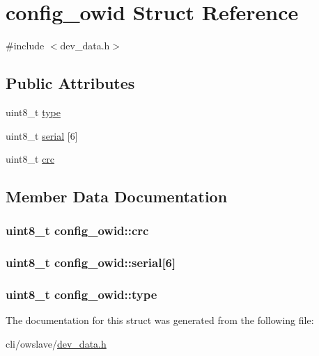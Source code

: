 \hypertarget{structconfig__owid}{\section{config\-\_\-owid Struct Reference}
\label{structconfig__owid}
}


{\ttfamily \#include $<$dev\-\_\-data.\-h$>$}

\subsection*{Public Attributes}
\begin{DoxyCompactItemize}
\item 
uint8\-\_\-t \hyperlink{structconfig__owid_a923d52b3e8b0ddd213df86cd5a6fc760}{type}
\item 
uint8\-\_\-t \hyperlink{structconfig__owid_abfab5874606cb60963c2d5817fe444e8}{serial} \mbox{[}6\mbox{]}
\item 
uint8\-\_\-t \hyperlink{structconfig__owid_af628a17297757d5927b23e4e9993261a}{crc}
\end{DoxyCompactItemize}


\subsection{Member Data Documentation}
\hypertarget{structconfig__owid_af628a17297757d5927b23e4e9993261a}{
\subsubsection[{crc}]{\setlength{\rightskip}{0pt plus 5cm}uint8\-\_\-t config\-\_\-owid\-::crc}}\label{structconfig__owid_af628a17297757d5927b23e4e9993261a}
\hypertarget{structconfig__owid_abfab5874606cb60963c2d5817fe444e8}{
\subsubsection[{serial}]{\setlength{\rightskip}{0pt plus 5cm}uint8\-\_\-t config\-\_\-owid\-::serial\mbox{[}6\mbox{]}}}\label{structconfig__owid_abfab5874606cb60963c2d5817fe444e8}
\hypertarget{structconfig__owid_a923d52b3e8b0ddd213df86cd5a6fc760}{
\subsubsection[{type}]{\setlength{\rightskip}{0pt plus 5cm}uint8\-\_\-t config\-\_\-owid\-::type}}\label{structconfig__owid_a923d52b3e8b0ddd213df86cd5a6fc760}


The documentation for this struct was generated from the following file\-:\begin{DoxyCompactItemize}
\item 
cli/owslave/\hyperlink{dev__data_8h}{dev\-\_\-data.\-h}\end{DoxyCompactItemize}
